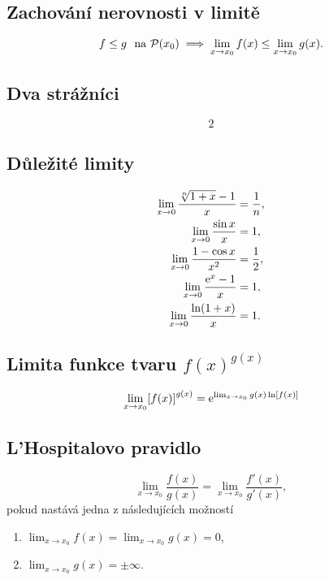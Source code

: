 \documentclass[columns=2]{cheatsheet}
\begin{document}
\subsection{Zachování nerovnosti v limitě}
\begin{equation*}
  f \le g \text{\,\, na $\mathcal{P}(x_0)$}
  \implies
  \lim_{x \to x_0} f(x) \le \lim_{x \to x_0} g(x).
\end{equation*}

\subsection{Dva strážníci}
\begin{equation*}
2  
\end{equation*}

\subsection{Důležité limity}
\setlength{\jot}{6pt}
\begin{align*}
  \lim_{x \to 0} \frac{\sqrt[n]{1 + x} - 1}{x} 
  &=
  \frac{1}{n},
  \\
  \lim_{x \to 0} \frac{\sin x}{x} 
  &= 
  1,
  \\
  \lim_{x \to 0} \frac{1 - \cos x}{x^2} 
  &= 
  \frac{1}{2},
  \\
  \lim_{x \to 0} \frac{\exponential{x} - 1}{x}
  &=
  1,
  \\
  \lim_{x \to 0} \frac{\ln\parens{1 + x}}{x}
  &=
  1.
\end{align*}

\vfill\null\columnbreak

\subsection{Limita funkce tvaru $f(x)^{g(x)}$}
\begin{equation*}
  \lim_{x \to x_0} \brackets{f(x)}^{g(x)}
  =
  \exponential{\lim_{x \to x_0} g(x) \ln \brackets{f(x)}}
\end{equation*}

\subsection{L'Hospitalovo pravidlo}
\begin{equation*}
  \lim_{x \to x_0} \frac{f(x)}{g(x)}
  =
  \lim_{x \to x_0} \frac{f'(x)}{g'(x)},
\end{equation*}
pokud nastává jedna z následujících možností
\begin{enumerate}
  \item $\lim_{x \to x_0} f(x) = \lim_{x \to x_0} g(x) = 0$,
  \item $\lim_{x \to x_0} g(x) = \pm \infty$.
\end{enumerate}
\end{document}
